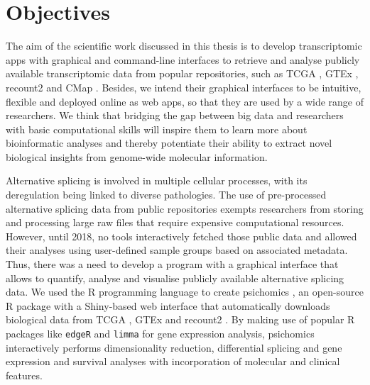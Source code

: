\chapter{Objectives}

The aim of the scientific work discussed in this thesis is to develop transcriptomic apps with graphical and command-line interfaces to retrieve and analyse publicly available transcriptomic data from popular repositories, such as TCGA \cite{chang:2013ww}, GTEx \cite{lonsdale:2013uo}, recount2 \cite{collado-torres:2017uw} and CMap \cite{subramanian:2017ul}. Besides, we intend their graphical interfaces to be intuitive, flexible and deployed online as web apps, so that they are used by a wide range of researchers. We think that bridging the gap between big data and researchers with basic computational skills will inspire them to learn more about bioinformatic analyses and thereby potentiate their ability to extract novel biological insights from genome-wide molecular information.

Alternative splicing is involved in multiple cellular processes, with its deregulation being linked to diverse pathologies. The use of pre-processed alternative splicing data from public repositories exempts researchers from storing and processing large raw files that require expensive computational resources. However, until 2018, no tools interactively fetched those public data and allowed their analyses using user-defined sample groups based on associated metadata. Thus, there was a need to develop a program with a graphical interface that allows to quantify, analyse and visualise publicly available alternative splicing data. We used the R programming language to create psichomics \cite{saraiva-agostinho:2018uq,saraiva-agostinho:2020wz}, an open-source R package with a Shiny-based web interface that automatically downloads biological data from TCGA \cite{chang:2013ww}, GTEx \cite{lonsdale:2013uo} and recount2 \cite{collado-torres:2017uw}. By making use of popular R packages like \texttt{edgeR} \cite{robinson:2010wx} and \texttt{limma} \cite{ritchie:2015tm} for gene expression analysis, psichomics interactively performs dimensionality reduction, differential splicing and gene expression and survival analyses with incorporation of molecular and clinical features. %

